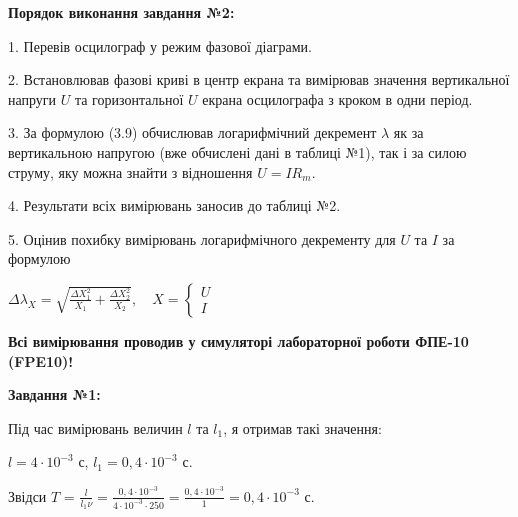 \documentclass[12pt,a4paper]{article}
\begin{document}
    \setlength{\parindent}{0pt}

    \textbf{Порядок виконання завдання №2:}

    \vspace{1em} %

    \setlength{\parindent}{1.5em}

    1. Перевів осцилограф у режим фазової діаграми.
    
    2. Встановлював фазові криві в центр екрана та вимірював значення вертикальної напруги $U$ та горизонтальної $U$ екрана осцилографа з кроком в одни період.

    3. За формулою (3.9) обчислював логарифмічний декремент $\lambda$ як за вертикальною напругою (вже обчислені дані в таблиці №1), так і за силою струму, яку можна знайти з відношення $U = IR_m$.

    4. Результати всіх вимірювань заносив до таблиці №2.

    5. Оцінив похибку вимірювань логарифмічного декременту для $U$ та $I$ за формулою

    \begin{center}
        $\displaystyle \Delta \lambda_X = \sqrt{\frac{\Delta X_1^2}{X_1} + \frac{\Delta X_2^2}{X_2}}, \quad X = 
        \begin{cases}
        U\\
        I
        \end{cases}$
    \end{center}

    \vspace{1em} %
    \setlength{\parindent}{0pt}

    \textbf{Всі вимірювання проводив у симуляторі лабораторної роботи ФПЕ-10 (FPE10)!}

    \newpage

    \textbf{\large Завдання №1:}

    \vspace{1em} %

    Під час вимірювань величин $l$ та $l_1$, я отримав такі значення:

    \vspace{1em} %

    $l = 4 \cdot 10^{-3}$ с, $l_1 = 0,4 \cdot 10^{-3}$ с.

    \vspace{1em} %

    Звідси $T$ = $\displaystyle \frac{l}{l_1 \nu} = \frac{0,4 \cdot 10^{-3}}{4 \cdot 10^{-3} \cdot 250} = \frac{0,4 \cdot 10^{-3}}{1} = 0,4 \cdot 10^{-3}$ с.
\end{document}
